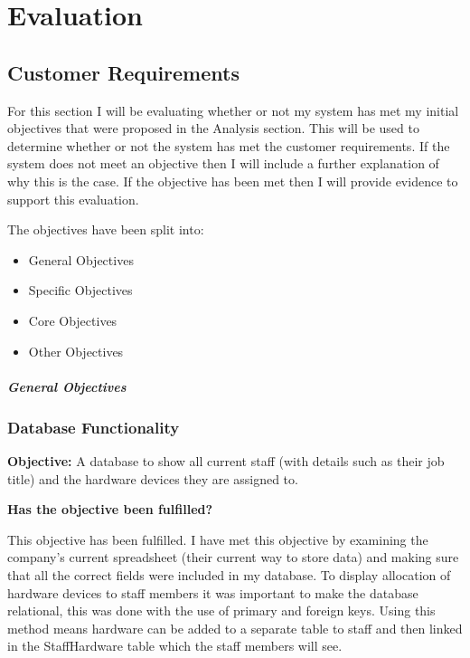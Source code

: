\chapter{Evaluation}

\section{Customer Requirements}

For this section I will be evaluating whether or not my system has met my initial objectives that were proposed in the Analysis section. This will be used to determine whether or not the system has met the customer requirements. If the system does not meet an objective then I will include a further explanation of why this is the case. If the objective has been met then I will provide evidence to support this evaluation.

The objectives have been split into:
\begin{itemize}
\item{General Objectives}
\item{Specific Objectives}
\item{Core Objectives}
\item{Other Objectives}
\end{itemize}

\paragraph{General Objectives}

\subsection{Database Functionality}\label{staffhardware}

\textbf{Objective:} A database to show all current staff (with details such as their job title) and the hardware devices they are assigned to.

\textbf{Has the objective been fulfilled?}

This objective has been fulfilled. I have met this objective by examining the company's current spreadsheet (their current way to store data) and making sure that all the correct fields were included in my database. To display allocation of hardware devices to staff members it was important to make the database relational, this was done with the use of primary and foreign keys. Using this method means hardware can be added to a separate table to staff and then linked in the StaffHardware table which the staff members will see.

